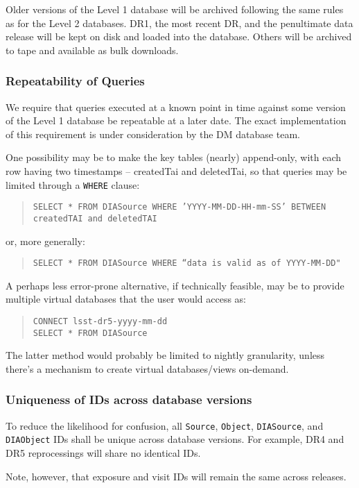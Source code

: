 \documentclass[12pt]{article}
\newcommand{\code}[1]{\texttt{#1}}
\newcommand{\DIASource}{\code{DIASource}\xspace}
\newcommand{\DIAObject}{\code{DIAObject}\xspace}
\newcommand{\DB}{{Level 1 database}\xspace}
\newcommand{\DR}{{Level 2 database}\xspace}
\newcommand{\Object}{\code{Object}\xspace}
\newcommand{\Source}{\code{Source}\xspace}
\begin{document}
Older versions of the \DB will be archived following the same rules as for the
\DR{}s. DR1, the most recent DR, and the penultimate data release will be kept
on disk and loaded into the database. Others will be archived to tape and
available as bulk downloads.

\subsubsection{Repeatability of Queries}

We require that queries executed at a known point in time against some version
of the \DB be repeatable at a later date. The exact implementation of this
requirement is under consideration by the DM database team.

One possibility may be to make the key tables (nearly) append-only, with each
row having two timestamps -- createdTai and deletedTai, so that queries may be
limited through a \code{WHERE} clause:
%
\begin{quote}
\texttt{SELECT * FROM DIASource WHERE 'YYYY-MM-DD-HH-mm-SS' BETWEEN createdTAI and deletedTAI}
\end{quote}
%
or, more generally:
%
\begin{quote}
\code{SELECT * FROM DIASource WHERE ``data is valid as of YYYY-MM-DD"}
\end{quote}

A perhaps less error-prone alternative, if technically feasible, may be to
provide multiple virtual databases that the user would access as:
%
\begin{quote}
\texttt{CONNECT lsst-dr5-yyyy-mm-dd} \\
\texttt{SELECT * FROM DIASource}
\end{quote}
%
The latter method would probably be limited to nightly granularity, unless
there's a mechanism to create virtual databases/views on-demand.

\subsubsection{Uniqueness of IDs across database versions}

To reduce the likelihood for confusion, all \Source, \Object, \DIASource, and
\DIAObject IDs shall be unique across database versions. For example, DR4 and
DR5 reprocessings will share no identical IDs. 

Note, however, that exposure and visit IDs will remain the same across
releases.
\end{document}

